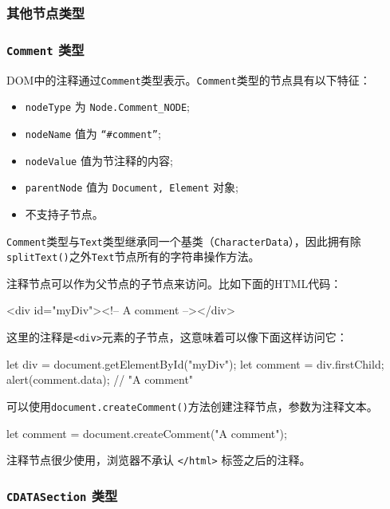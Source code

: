 \subsubsection{其他节点类型}

\subsubsection*{\texttt{Comment} 类型}

DOM中的注释通过\texttt{Comment}类型表示。\texttt{Comment}类型的节点具有以下特征：

\begin{itemize}
    \item \texttt{nodeType} 为 \texttt{Node.Comment\_NODE};
    \item \texttt{nodeName} 值为 \texttt{``\#comment''};
    \item \texttt{nodeValue} 值为节注释的内容;
    \item \texttt{parentNode} 值为 \texttt{Document, Element} 对象;
    \item 不支持子节点。
\end{itemize}

\texttt{Comment}类型与\texttt{Text}类型继承同一个基类（\texttt{CharacterData}），因此拥有除\texttt{splitText()}之外\texttt{Text}节点所有的字符串操作方法。

注释节点可以作为父节点的子节点来访问。比如下面的HTML代码：

\begin{HTML}
<div id="myDiv"><!-- A comment --></div>
\end{HTML}

这里的注释是\texttt{<div>}元素的子节点，这意味着可以像下面这样访问它：

\begin{JavaScript}
let div = document.getElementById("myDiv"); 
let comment = div.firstChild; 
alert(comment.data); // "A comment" 
\end{JavaScript}

可以使用\texttt{document.createComment()}方法创建注释节点，参数为注释文本。

\begin{JavaScript}
let comment = document.createComment("A comment"); 
\end{JavaScript}

注释节点很少使用，浏览器不承认 \texttt{</html>} 标签之后的注释。

\subsubsection*{\texttt{CDATASection} 类型}

